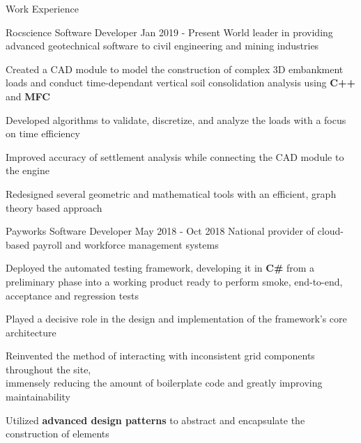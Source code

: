 \documentclass{resume} %
\begin{document}
\begin{rSection}{Work Experience}
    
    \begin{workexperience}
        {Rocscience}
        {Software Developer}
        {Jan 2019 - Present}
        {World leader in providing advanced geotechnical software to civil engineering and mining industries}
        {
            \item Created a CAD module to model the construction of complex 3D embankment loads and 
            conduct time-dependant vertical soil consolidation analysis using \textbf{C++} and \textbf{MFC}
            \item Developed algorithms to validate, discretize, and analyze the loads with a focus on time efficiency
            \item Improved accuracy of settlement analysis while connecting the CAD module to the engine
            \item Redesigned several geometric and mathematical tools with an efficient, graph theory based approach
        }
    \end{workexperience}

    \vspace{1em}
    
    \begin{workexperience}
        {Payworks}
        {Software Developer}
        {May 2018 - Oct 2018}
        {National provider of cloud-based payroll and workforce management systems}
        {
            \item Deployed the automated testing framework, developing it in \textbf{C\#} from a preliminary phase into a working product ready to perform smoke, end-to-end, acceptance and regression tests
            \item Played a decisive role in the design and implementation of the framework's core architecture
            \item Reinvented the method of interacting with inconsistent grid components throughout the site, \\immensely reducing the amount of boilerplate code and greatly improving maintainability
            \item Utilized \textbf{advanced design patterns} to abstract and encapsulate the construction of elements
        }
    \end{workexperience}

    \vspace{1em}


\end{rSection}
\end{document}
